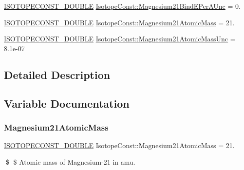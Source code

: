 \begin{DoxyCompactItemize}
\mbox{\hyperlink{group___isotope_const-_macros_ga8f45a7272ce02c0b4c65c44636ed719a}{I\+S\+O\+T\+O\+P\+E\+C\+O\+N\+S\+T\+\_\+\+D\+O\+U\+B\+LE}} \mbox{\hyperlink{group___isotope_const-_magnesium-_mg21_gac5e64aeed53c435a019e24873d026f02}{Isotope\+Const\+::\+Magnesium21\+Bind\+E\+Per\+A\+Unc}} = 0.
\item 
\mbox{\hyperlink{group___isotope_const-_macros_ga8f45a7272ce02c0b4c65c44636ed719a}{I\+S\+O\+T\+O\+P\+E\+C\+O\+N\+S\+T\+\_\+\+D\+O\+U\+B\+LE}} \mbox{\hyperlink{group___isotope_const-_magnesium-_mg21_ga844bba4a22661916ef8c8080c06fb4d5}{Isotope\+Const\+::\+Magnesium21\+Atomic\+Mass}} = 21.
\item 
\mbox{\hyperlink{group___isotope_const-_macros_ga8f45a7272ce02c0b4c65c44636ed719a}{I\+S\+O\+T\+O\+P\+E\+C\+O\+N\+S\+T\+\_\+\+D\+O\+U\+B\+LE}} \mbox{\hyperlink{group___isotope_const-_magnesium-_mg21_ga7d6c7b73266ec12965dff702675dcb83}{Isotope\+Const\+::\+Magnesium21\+Atomic\+Mass\+Unc}} = 8.\+1e-\/07
\end{DoxyCompactItemize}


\subsection{Detailed Description}


\subsection{Variable Documentation}
\mbox{\label{group___isotope_const-_magnesium-_mg21_ga844bba4a22661916ef8c8080c06fb4d5}} 
\subsubsection{\texorpdfstring{Magnesium21\+Atomic\+Mass}{Magnesium21AtomicMass}}
{\footnotesize\ttfamily \mbox{\hyperlink{group___isotope_const-_macros_ga8f45a7272ce02c0b4c65c44636ed719a}{I\+S\+O\+T\+O\+P\+E\+C\+O\+N\+S\+T\+\_\+\+D\+O\+U\+B\+LE}} Isotope\+Const\+::\+Magnesium21\+Atomic\+Mass = 21.}

\$ \$ Atomic mass of Magnesium-\/21 in amu. \mbox{\label{group___isotope_const-_magnesium-_mg21_ga7d6c7b73266ec12965dff702675dcb83}} 
